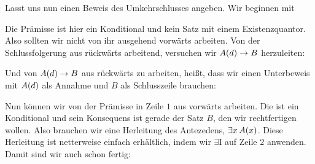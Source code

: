 Lasst uns nun einen Beweis des Umkehrschlusses angeben. Wir beginnen mit
\begin{fitchproof}
	\ellipsesline
\end{fitchproof}
Die Prämisse ist hier ein Konditional und kein Satz mit einem Existenzquantor. Also sollten wir nicht von ihr ausgehend vorwärts arbeiten. Von der Schlussfolgerung aus rückwärts arbeitend, versuchen wir $\mathord{A}(d) \rightarrow B$ herzuleiten:
\begin{fitchproof}
	\ellipsesline
\end{fitchproof}
Und von $\mathord{A}(d) \rightarrow B$ aus rückwärts zu arbeiten, hei{\ss}t, dass wir einen Unterbeweis mit $\mathord{A}(d)$ als Annahme und $B$ als Schlusszeile brauchen:
\begin{fitchproof}
	\open
	\ellipsesline
	\close
\end{fitchproof}
Nun können wir von der Prämisse in Zeile $1$ aus vorwärts arbeiten. Die ist ein Konditional und sein Konsequens ist gerade der Satz $B$, den wir rechtfertigen wollen. Also brauchen wir eine Herleitung des Antezedens, $\exists x\,\mathord{A}(x)$. Diese Herleitung ist netterweise einfach erhältlich, indem wir $\exists$I auf Zeile $2$ anwenden. Damit sind wir auch schon fertig:
\begin{fitchproof}
	\open
	\close
\end{fitchproof}

\practiceproblems

